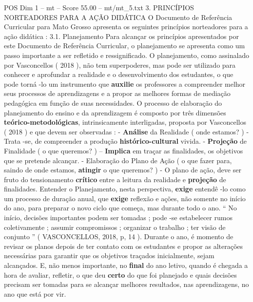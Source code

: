 \begin{textsample}{POS Dim 1 – mt – Score 55.00 – mt/mt\_5.txt}  \label{ex:f1_pos_080}
3.
PRINCÍPIOS NORTEADORES PARA A AÇÃO DIDÁTICA O Documento de Referência Curricular para Mato Grosso apresenta os seguintes princípios norteadores para a ação didática : 3.1.
Planejamento Para alcançar os princípios apresentados por este Documento de Referência Curricular, o planejamento se apresenta como um passo importante a ser refletido e ressignificado.
O planejamento, como assinalado por Vasconcellos ( 2018 ), não tem superpoderes, mas pode ser utilizado para conhecer e aprofundar a realidade e o desenvolvimento dos estudantes, o que pode torná -lo um instrumento que \textbf{auxilie} os professores a compreender melhor seus processos de aprendizagens e a propor as melhores formas de mediação pedagógica em função de suas necessidades.
O processo de elaboração do planejamento do ensino e da aprendizagem é composto por três dimensões \textbf{teórico-metodológicas}, intrinsicamente interligadas, proposta por Vasconcellos ( 2018 ) e que devem ser observadas : - \textbf{Análise} da Realidade ( onde estamos? ) - Trata -se, de compreender a produção \textbf{histórico-cultural} vivida. - \textbf{Projeção} de Finalidade ( o que queremos? ) – \textbf{Implica} em traçar as finalidades, os objetivos que se pretende alcançar. - Elaboração do Plano de Ação ( o que fazer para, saindo de onde estamos, \textbf{atingir} o que queremos? ) - O plano de ação, deve ser fruto do tensionamento \textbf{crítico} entre a leitura da realidade e \textbf{projeção} de finalidades.
Entender o Planejamento, nesta perspectiva, \textbf{exige} entendê -lo como um processo de duração anual, que \textbf{exige} reflexão e ações, não somente no início do ano, para preparar o novo ciclo que começa, mas durante todo o ano. “ No início, decisões importantes podem ser tomadas ; pode -se estabelecer rumos coletivamente ; assumir compromissos ; organizar o trabalho ; ter visão de conjunto ” ( VASCONCELLOS, 2018, p, 14 ).
Durante o ano, é momento de revisar os planos depois de ter contato com os estudantes e propor as alterações necessárias para garantir que os objetivos traçados inicialmente, sejam alcançados.
E, não menos importante, no \textbf{final} do ano letivo, quando é chegada a hora de avaliar, refletir, o que deu \textbf{certo} do que foi planejado e quais decisões precisam ser tomadas para se alcançar melhores resultados, nas aprendizagens, no ano que está por vir.

\end{textsample}
